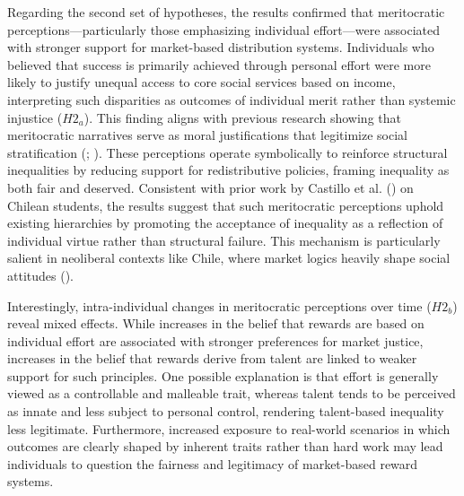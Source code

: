 \documentclass[
  12pt,
]{article}
\begin{document}
Regarding the second set of hypotheses, the results confirmed that
meritocratic perceptions---particularly those emphasizing individual
effort---were associated with stronger support for market-based
distribution systems. Individuals who believed that success is primarily
achieved through personal effort were more likely to justify unequal
access to core social services based on income, interpreting such
disparities as outcomes of individual merit rather than systemic
injustice (\(H2_{a}\)). This finding aligns with previous research
showing that meritocratic narratives serve as moral justifications that
legitimize social stratification
(;
). These perceptions
operate symbolically to reinforce structural inequalities by reducing
support for redistributive policies, framing inequality as both fair and
deserved. Consistent with prior work by Castillo et al.
() on Chilean students,
the results suggest that such meritocratic perceptions uphold existing
hierarchies by promoting the acceptance of inequality as a reflection of
individual virtue rather than structural failure. This mechanism is
particularly salient in neoliberal contexts like Chile, where market
logics heavily shape social attitudes
().

Interestingly, intra-individual changes in meritocratic perceptions over
time (\(H2_{b}\)) reveal mixed effects. While increases in the belief
that rewards are based on individual effort are associated with stronger
preferences for market justice, increases in the belief that rewards
derive from talent are linked to weaker support for such principles. One
possible explanation is that effort is generally viewed as a
controllable and malleable trait, whereas talent tends to be perceived
as innate and less subject to personal control, rendering talent-based
inequality less legitimate. Furthermore, increased exposure to
real-world scenarios in which outcomes are clearly shaped by inherent
traits rather than hard work may lead individuals to question the
fairness and legitimacy of market-based reward systems.
\end{document}
